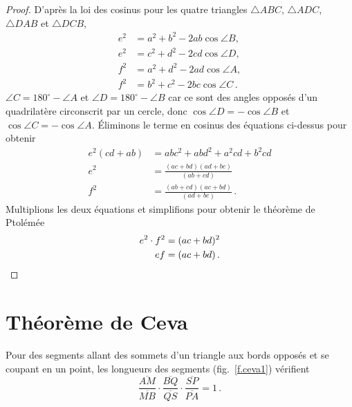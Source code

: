 \begin{proof}
D'après la loi des cosinus pour les quatre triangles  $\triangle ABC$, $\triangle ADC$, $\triangle DAB$ et $\triangle DCB$,
\begin{align*}
e^2 &= a^2 + b^2 - 2ab \cos \angle B,\\
e^2 &= c^2 + d^2 - 2cd \cos \angle D,\\
f^2 &= a^2 + d^2 - 2ad \cos \angle A,\\
f^2 &= b^2 + c^2 - 2bc \cos \angle C\,.
\end{align*}
$\angle C = 180^\circ - \angle A$ et $\angle D = 180^\circ - \angle B$ car ce sont des angles opposés d'un quadrilatère circonscrit par un cercle, donc $\cos \angle D = - \cos \angle B$ et $\cos \angle C = -\cos \angle A$. Éliminons le terme en cosinus des équations ci-dessus pour obtenir 
\begin{align*}
e^2(cd+ab)&=abc^2+abd^2+a^2cd+b^2cd\\
e^2 &= \frac{(ac+bd)(ad+bc)}{(ab+cd)}\\
f^2 &= \frac{(ab+cd)(ac+bd)}{(ad+bc)}\,.
\end{align*}
Multiplions les deux équations et simplifions pour obtenir le théorème de Ptolémée 
\begin{align*}
e^2\cdot f^2 &= (ac+bd)^2\\
ef &= (ac+bd)\,.\qedhere
\end{align*}
\end{proof}


\section{Théorème de Ceva}\label{a.ceva}

\begin{theorem}[Ceva]
Pour des segments  allant des sommets d'un triangle aux bords opposés et se coupant en un point, les longueurs des segments (fig.~\ref{f.ceva1}) vérifient 
  \label{thm.ceva}
\[
\frac{\overline{AM}}{\overline{MB}}\cdot\frac{\overline{BQ}}{\overline{QS}}\cdot\frac{\overline{SP}}{\overline{PA}} = 1\,.
\]
\end{theorem}

